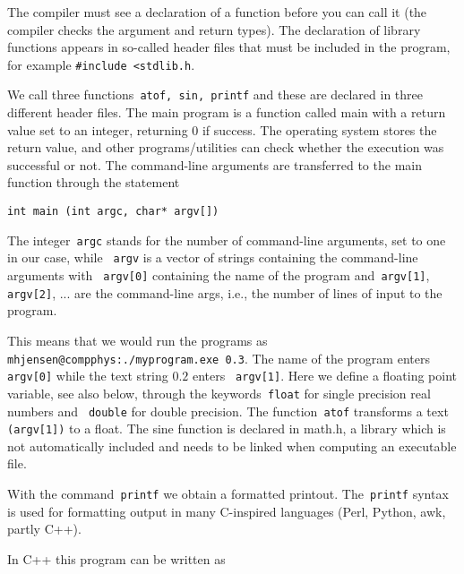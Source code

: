 The compiler must see a declaration of a function before you can 
call it (the compiler checks the argument and return types). 
The declaration of library functions appears 
in so-called header files that must be included in the program, for example
\verb?#include <stdlib.h?.

We call three functions\verb? atof, sin, printf? 
and these are declared in three different header files. 
The main program is a function called main 
with a return value set to an integer,  returning 0 if success. 
The operating system stores the return value, 
and other programs/utilities can check whether 
the execution was successful or not. 
The command-line arguments are transferred to the main function through  the statement
\begin{lstlisting}
int main (int argc, char* argv[])
\end{lstlisting}
The integer\verb? argc? stands for the number of command-line arguments, set to
one in our case, while  
\verb? argv? is a vector of strings containing the command-line arguments 
with   \verb? argv[0]? containing  the name of the program 
and\verb? argv[1]?,\verb? argv[2]?, ... are the command-line args, i.e., the number of 
lines of input to the program.  

This means that we would run the programs as 
\verb?mhjensen@compphys:./myprogram.exe 0.3?.  The name of the program enters \verb? argv[0]? while the text string $0.2$ enters \verb? argv[1]?. Here we define a floating point variable, see also below, through the keywords\verb? float? for single precision real numbers and  \verb? double? for double precision.  The function\verb? atof?  transforms a text \verb? (argv[1])? to a float.  The sine function is declared in math.h, a library which is not automatically included and needs to be linked when computing an executable file.

With the command\verb? printf? we obtain a formatted printout.
The\verb? printf? syntax is used for formatting output 
in many C-inspired languages (Perl, Python, awk, partly C++). 

In C++ this program can be written as 

